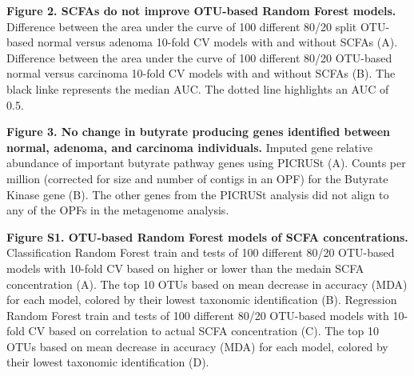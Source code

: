 \documentclass[11pt,]{article}
\begin{document}
\textbf{Figure 2. SCFAs do not improve OTU-based Random Forest models.}
Difference between the area under the curve of 100 different 80/20 split
OTU-based normal versus adenoma 10-fold CV models with and without SCFAs
(A). Difference between the area under the curve of 100 different 80/20
OTU-based normal versus carcinoma 10-fold CV models with and without
SCFAs (B). The black linke represents the median AUC. The dotted line
highlights an AUC of 0.5.

\textbf{Figure 3. No change in butyrate producing genes identified
between normal, adenoma, and carcinoma individuals.} Imputed gene
relative abundance of important butyrate pathway genes using PICRUSt
(A). Counts per million (corrected for size and number of contigs in an
OPF) for the Butyrate Kinase gene (B). The other genes from the PICRUSt
analysis did not align to any of the OPFs in the metagenome analysis.

\newpage

\textbf{Figure S1. OTU-based Random Forest models of SCFA
concentrations.} Classification Random Forest train and tests of 100
different 80/20 OTU-based models with 10-fold CV based on higher or
lower than the medain SCFA concentration (A). The top 10 OTUs based on
mean decrease in accuracy (MDA) for each model, colored by their lowest
taxonomic identification (B). Regression Random Forest train and tests
of 100 different 80/20 OTU-based models with 10-fold CV based on
correlation to actual SCFA concentration (C). The top 10 OTUs based on
mean decrease in accuracy (MDA) for each model, colored by their lowest
taxonomic identification (D).
\end{document}
